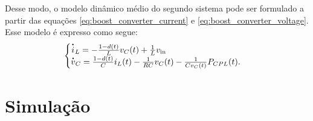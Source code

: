 Desse modo, o modelo dinâmico médio do segundo sistema pode ser formulado a partir das equações \eqref{eq:boost_converter_current} e \eqref{eq:boost_converter_voltage}. Esse modelo é expresso como segue: \begin{equation} \begin{cases} \dt{i}_L = - \frac{1-d(t)}{L}v_C(t) + \frac{1}{L}v_{\text{in}}\\ \dt{v}_C = \frac{1 - d(t)}{C} i_L(t) - \frac{1}{RC}v_C(t) - \frac{1}{Cv_C(t)}P_{CPL}(t). \end{cases} \end{equation}



\section{Simulação}
